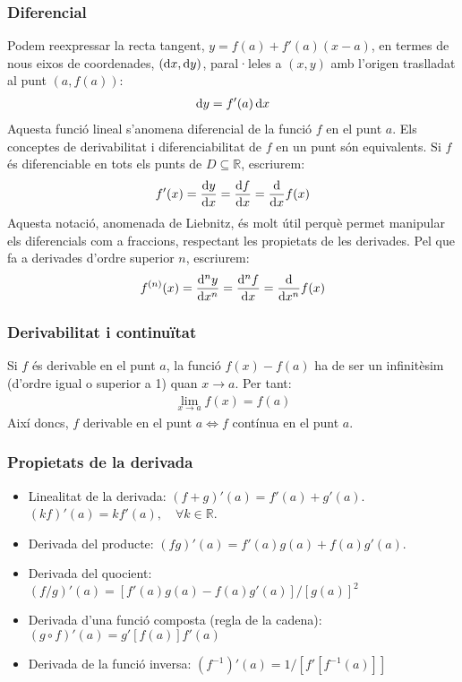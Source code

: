 \subsubsection*{Diferencial}
Podem reexpressar la recta tangent, $y = f(a) + f'(a)(x-a)$, en termes de nous eixos de coordenades, $(\mathrm{d} x,\mathrm{d} y)$, paral·leles a $(x,y)$ amb l'origen traslladat al punt $(a,f(a))$:
\begin{align}
    \mathrm{d} y = f'(a) \mathop{}\!\mathrm{d} x
\end{align}
Aquesta funció lineal s'anomena diferencial de la funció $f$ en el punt $a$. Els conceptes de derivabilitat i diferenciabilitat de $f$ en un punt són equivalents. Si $f$ és diferenciable en tots els punts de $D \subseteq \mathbb{R}$, escriurem:
\begin{align}
    f'(x)= \frac{\mathrm{d} y}{\mathrm{d} x} = \frac{\mathrm{d} f}{\mathrm{d} x} = \frac{\mathrm{d} }{\mathrm{d} x}f(x)
\end{align}
Aquesta notació, anomenada de Liebnitz, és molt útil perquè permet manipular els diferencials com a fraccions, respectant les propietats de les derivades. Pel que fa a derivades d'ordre superior $n$, escriurem:
\begin{align}
    f^{(n)}(x)= \frac{\mathrm{d} ^{n}y}{\mathrm{d} x^{n}} = \frac{\mathrm{d} ^{n}f}{\mathrm{d} x} = \frac{\mathrm{d} }{\mathrm{d} x^{n}}f(x)
\end{align}

\subsubsection*{Derivabilitat i continuïtat}
Si $f$ és derivable en el punt $a$, la funció $f(x)-f(a)$ ha de ser un infinitèsim (d'ordre igual o superior a 1) quan $x \to a$. Per tant:
\begin{align}
    \lim\limits_{x \to a} f(x) = f(a)
\end{align}
Així doncs, $f$ derivable en el punt $a \Leftrightarrow f$ contínua en el punt $a$.

\subsubsection*{Propietats de la derivada}
\begin{itemize}
    \item Linealitat de la derivada:
        \subitem $(f+g)'(a) = f'(a) + g'(a)$.
        \subitem $(kf)'(a) = kf'(a), \quad \forall k \in \mathbb{R}$.
    \item Derivada del producte:
        \subitem $(fg)'(a) = f'(a)g(a) + f(a)g'(a)$.
    \item Derivada del quocient:
        \subitem $(f/g)'(a)= [f'(a)g(a)-f(a)g'(a)]/[g(a)]^{2}$
    \item Derivada d'una funció composta (regla de la cadena):
        \subitem $(g \circ f)'(a) = g'[f(a)] f'(a)$
    \item Derivada de la funció inversa:
        \subitem $(f^{-1})'(a) = 1/[f'[f^{-1}(a)]]$
\end{itemize}

